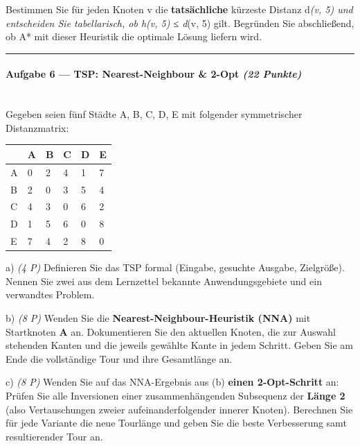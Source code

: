 \documentclass[11pt, a4paper]{article}
\begin{document}
Bestimmen Sie für jeden Knoten v die \textbf{tatsächliche} kürzeste Distanz d\textit{(v, 5) und entscheiden Sie tabellarisch, ob h(v, 5) ≤ d}(v, 5) gilt. Begründen Sie abschließend, ob A* mit dieser Heuristik die optimale Lösung liefern wird.



\noindent\textcolor{rulegray}{\rule{\linewidth}{0.4pt}}


\paragraph{Aufgabe 6 — TSP: Nearest-Neighbour \& 2-Opt \textit{(22 Punkte)}}\mbox{}\\[2pt]

Gegeben seien fünf Städte A, B, C, D, E mit folgender symmetrischer Distanzmatrix:



{\small
\begin{tabularx}{\linewidth}{XXXXXX}
\hline
\rowcolor{tableheadbg}
{\color{white}\textbf{}} & {\color{white}\textbf{A}} & {\color{white}\textbf{B}} & {\color{white}\textbf{C}} & {\color{white}\textbf{D}} & {\color{white}\textbf{E}} \\[2pt]
\hline
\endhead
\hline
\endfoot
A & 0 & 2 & 4 & 1 & 7 \\
B & 2 & 0 & 3 & 5 & 4 \\
C & 4 & 3 & 0 & 6 & 2 \\
D & 1 & 5 & 6 & 0 & 8 \\
E & 7 & 4 & 2 & 8 & 0 \\
\end{tabularx}
}


a) \textit{(4 P)} Definieren Sie das TSP formal (Eingabe, gesuchte Ausgabe, Zielgröße). Nennen Sie zwei aus dem Lernzettel bekannte Anwendungsgebiete und ein verwandtes Problem.


b) \textit{(8 P)} Wenden Sie die \textbf{Nearest-Neighbour-Heuristik (NNA)} mit Startknoten \textbf{A} an. Dokumentieren Sie den aktuellen Knoten, die zur Auswahl stehenden Kanten und die jeweils gewählte Kante in jedem Schritt. Geben Sie am Ende die vollständige Tour und ihre Gesamtlänge an.


c) \textit{(8 P)} Wenden Sie auf das NNA-Ergebnis aus (b) \textbf{einen 2-Opt-Schritt} an: Prüfen Sie alle Inversionen einer zusammenhängenden Subsequenz der \textbf{Länge 2} (also Vertauschungen zweier aufeinanderfolgender innerer Knoten). Berechnen Sie für jede Variante die neue Tourlänge und geben Sie die beste Verbesserung samt resultierender Tour an.
\end{document}
